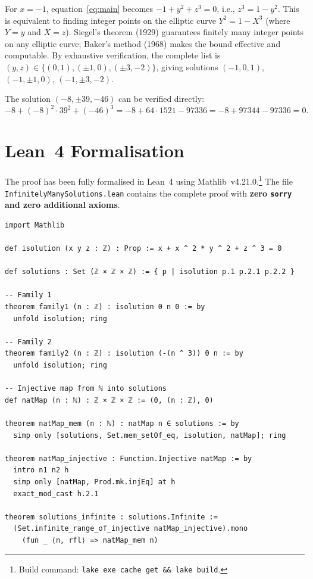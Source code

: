 \documentclass[12pt,a4paper]{article}
\theoremstyle{definition}
\begin{document}
For $x = -1$, equation~\eqref{eq:main} becomes $-1 + y^2 + z^3 = 0$, i.e., $z^3 = 1 - y^2$.
This is equivalent to finding integer points on the elliptic curve $Y^2 = 1 - X^3$
(where $Y = y$ and $X = z$).  Siegel's theorem (1929) guarantees finitely many integer points
on any elliptic curve; Baker's method (1968) makes the bound effective and computable.
By exhaustive verification,
the complete list is $(y, z) \in \{(0, 1), (\pm 1, 0), (\pm 3, -2)\}$,
giving solutions $(-1, 0, 1)$, $(-1, \pm 1, 0)$, $(-1, \pm 3, -2)$.

The solution $(-8, \pm 39, -46)$ can be verified directly:
\[
  -8 + (-8)^2 \cdot 39^2 + (-46)^3 = -8 + 64 \cdot 1521 - 97336 = -8 + 97344 - 97336 = 0.
\]

\section{Lean~4 Formalisation}

The proof has been fully formalised in Lean~4 using
Mathlib~v4.21.0.\footnote{Build command: \texttt{lake exe cache get \&\& lake build}.}
The file \texttt{InfinitelyManySolutions.lean} contains the complete proof with
\textbf{zero \texttt{sorry} and zero additional axioms}.

\begin{lstlisting}[language=Lean4,caption={Core Lean 4 proof skeleton}]
import Mathlib

def isolution (x y z : ℤ) : Prop := x + x ^ 2 * y ^ 2 + z ^ 3 = 0

def solutions : Set (ℤ × ℤ × ℤ) := { p | isolution p.1 p.2.1 p.2.2 }

-- Family 1
theorem family1 (n : ℤ) : isolution 0 n 0 := by
  unfold isolution; ring

-- Family 2
theorem family2 (n : ℤ) : isolution (-(n ^ 3)) 0 n := by
  unfold isolution; ring

-- Injective map from ℕ into solutions
def natMap (n : ℕ) : ℤ × ℤ × ℤ := (0, (n : ℤ), 0)

theorem natMap_mem (n : ℕ) : natMap n ∈ solutions := by
  simp only [solutions, Set.mem_setOf_eq, isolution, natMap]; ring

theorem natMap_injective : Function.Injective natMap := by
  intro n1 n2 h
  simp only [natMap, Prod.mk.injEq] at h
  exact_mod_cast h.2.1

theorem solutions_infinite : solutions.Infinite :=
  (Set.infinite_range_of_injective natMap_injective).mono
    (fun _ ⟨n, rfl⟩ => natMap_mem n)
\end{lstlisting}
\end{document}
